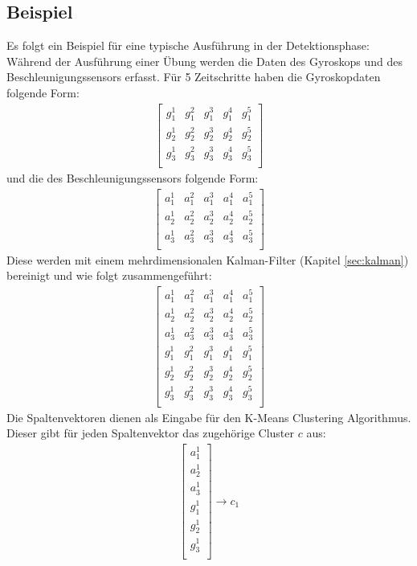 \documentclass{article}
\begin{document}
\subsection{Beispiel}
Es folgt ein Beispiel für eine typische Ausführung in der Detektionsphase:\\
Während der Ausführung einer Übung werden die Daten des Gyroskops und des Beschleunigungssensors erfasst.
Für 5 Zeitschritte haben die Gyroskopdaten folgende Form:
\begin{align*}
\left[\begin{array}{rrrrr}
g_{1}^1 & g_{1}^2 & g_{1}^3 & g_{1}^4 & g_{1}^5 \\
g_{2}^1 & g_{2}^2 & g_{2}^3 & g_{2}^4 & g_{2}^5 \\
g_{3}^1 & g_{3}^2 & g_{3}^3 & g_{3}^4 & g_{3}^5 \\
\end{array}\right]
\end{align*}
und die des Beschleunigungssensors folgende Form:
\begin{align*}
\left[\begin{array}{rrrrr}
a_{1}^1 & a_{1}^2 & a_{1}^3 & a_{1}^4 & a_{1}^5 \\
a_{2}^1 & a_{2}^2 & a_{2}^3 & a_{2}^4 & a_{2}^5 \\
a_{3}^1 & a_{3}^2 & a_{3}^3 & a_{3}^4 & a_{3}^5 \\
\end{array}\right]
\end{align*}
Diese werden mit einem mehrdimensionalen Kalman-Filter (Kapitel \ref{sec:kalman}) bereinigt und wie folgt zusammengeführt:
\begin{align*}
\left[\begin{array}{rrrrr}
a_{1}^1 & a_{1}^2 & a_{1}^3 & a_{1}^4 & a_{1}^5 \\
a_{2}^1 & a_{2}^2 & a_{2}^3 & a_{2}^4 & a_{2}^5 \\
a_{3}^1 & a_{3}^2 & a_{3}^3 & a_{3}^4 & a_{3}^5 \\
g_{1}^1 & g_{1}^2 & g_{1}^3 & g_{1}^4 & g_{1}^5 \\
g_{2}^1 & g_{2}^2 & g_{2}^3 & g_{2}^4 & g_{2}^5 \\
g_{3}^1 & g_{3}^2 & g_{3}^3 & g_{3}^4 & g_{3}^5 \\
\end{array}\right]
\end{align*}
Die Spaltenvektoren dienen als Eingabe für den K-Means Clustering Algorithmus.
Dieser gibt für jeden Spaltenvektor das zugehörige Cluster $c$ aus:
\begin{align*}
\left[\begin{array}{r}
a_{1}^1\\
a_{2}^1\\
a_{3}^1\\
g_{1}^1\\
g_{2}^1\\
g_{3}^1\\
\end{array}\right]
\rightarrow c_1
\end{align*}
\end{document}
